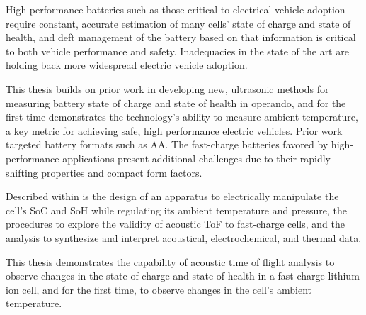 High performance batteries such as those critical to electrical vehicle adoption require constant, accurate estimation of many cells' state of charge and state of health, and deft management of the battery based on that information is critical to both vehicle performance and safety.
Inadequacies in the state of the art are holding back more widespread electric vehicle adoption.

This thesis builds on prior work in developing new, ultrasonic methods for measuring battery state of charge and state of health in operando, and for the first time demonstrates the technology's ability to measure ambient temperature, a key metric for achieving safe, high performance electric vehicles. Prior work targeted battery formats such as AA. The fast-charge batteries favored by high-performance applications present additional challenges due to their rapidly-shifting properties and compact form factors.

Described within is the design of an apparatus to electrically manipulate the cell's SoC and SoH while regulating its ambient temperature and pressure, the procedures to explore the validity of acoustic ToF to fast-charge cells, and the analysis to synthesize and interpret acoustical, electrochemical, and thermal data.

This thesis demonstrates the capability of acoustic time of flight analysis to observe changes in the state of charge and state of health in a fast-charge lithium ion cell, and for the first time, to observe changes in the cell's ambient temperature.
